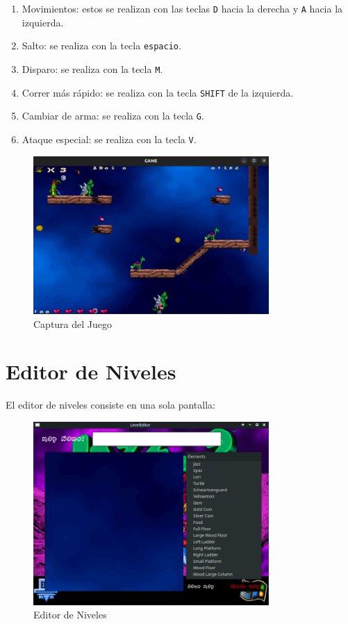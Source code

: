 \documentclass[titlepage,a4paper]{article}
\begin{document}
\begin{enumerate}
  \item Movimientos: estos se realizan con las teclas \texttt{D} hacia la derecha y \texttt{A} hacia la izquierda.
  \item Salto: se realiza con la tecla \texttt{espacio}.
  \item Disparo: se realiza con la tecla \texttt{M}.
  \item Correr más rápido: se realiza con la tecla \texttt{SHIFT} de la izquierda.
  \item Cambiar de arma: se realiza con la tecla \texttt{G}.
  \item Ataque especial: se realiza con la tecla \texttt{V}.
\end{enumerate}

\begin{figure}[H]
  \centering
  \includegraphics[width=0.8\textwidth]{images/gameScreen.png}
  \caption{Captura del Juego}
  \label{fig:game}
\end{figure}

\section{Editor de Niveles}
El editor de niveles consiste en una sola pantalla:

\begin{figure}[H]
  \centering
  \includegraphics[width=0.8\textwidth]{images/LevelEditor/LevelEditor.png}
  \caption{Editor de Niveles}
  \label{fig:level-editor}
\end{figure}
\end{document}
